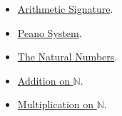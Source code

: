 \begin{dependencies}
\begin{itemize}
  \item \hyperref[def:arithmetic-signature]{Arithmetic Signature}.
  \item \hyperref[def:peano-system]{Peano System}.
  \item \hyperref[def:natural-numbers]{The Natural Numbers}.
  \item \hyperref[def:addition-on-peano-system]{Addition on $\mathbb N$}.
  \item \hyperref[def:multiplication-on-peano-system]{Multiplication on $\mathbb N$}.
\end{itemize}
\end{dependencies}
